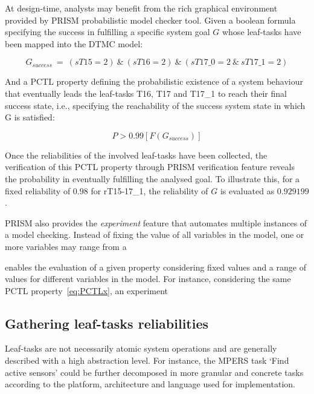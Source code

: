 At design-time, analysts may benefit from the rich graphical environment provided by PRISM probabilistic model checker tool. Given a boolean formula specifying the success in fulfilling a specific system goal $G$ whose leaf-tasks have been mapped into the DTMC model:

\begin{equation}\label{eq:Gx}
G_{success}\ =\ (sT15=2)\ \&\ (sT16=2)\ \&\ (sT17\_0=2\ \&\ sT17\_1=2)
\end{equation}

And a PCTL property defining the probabilistic existence of a system behaviour that eventually leads the leaf-tasks T16, T17 and T17\_1 to reach their final success state, i.e., specifying the reachability of the success system state in which G is satisfied:

\begin{equation}\label{eq:PCTLx}
P > 0.99 [ F (G_{success})]
\end{equation}

Once the reliabilities of the involved leaf-tasks have been collected, the verification of this PCTL property through PRISM verification feature reveals the probability in eventually fulfilling the analysed goal. To illustrate this, for a fixed reliability of $0.98$ for rT15-17\_1, the reliability of $G$ is evaluated as $0.929199$. 

PRISM also provides the \textit{experiment} feature that automates multiple instances of a model checking. Instead of fixing the value of all variables in the model, one or more variables may range from a 

enables the evaluation of a given property considering fixed values and a range of values for different variables in the model. For instance, considering the same PCTL property~\eqref{eq:PCTLx}, an experiment  



\subsection{Gathering leaf-tasks reliabilities}

Leaf-tasks are not necessarily atomic system operations and are generally described with a high abstraction level. For instance, the MPERS task `Find active sensors' could be further decomposed in more granular and concrete tasks according to the platform, architecture and language used for implementation. 


